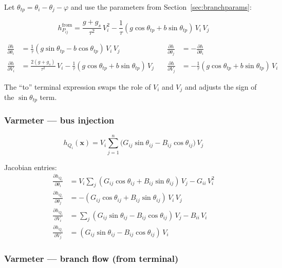 \documentclass[11pt,a4paper]{article}
\begin{document}
Let $\theta_{tp} = \theta_i - \theta_j - \varphi$ and use the parameters
from Section~\ref{sec:branchparams}:

\begin{equation}
  h_{P_{ij}}^\text{from} =
    \frac{g + g_s}{\tau^2}\,V_i^2
    - \frac{1}{\tau}(g\cos\theta_{tp} + b\sin\theta_{tp})\,V_i\,V_j
\end{equation}

\begin{align}
  \frac{\partial h}{\partial \theta_i} &=
    \tfrac{1}{\tau}(g\sin\theta_{tp} - b\cos\theta_{tp})\,V_i\,V_j
  &\quad \frac{\partial h}{\partial \theta_j} &= -\frac{\partial h}{\partial \theta_i}
  \\
  \frac{\partial h}{\partial V_i} &=
    \tfrac{2(g+g_s)}{\tau^2}\,V_i - \tfrac{1}{\tau}(g\cos\theta_{tp} +
    b\sin\theta_{tp})\,V_j
  &\quad \frac{\partial h}{\partial V_j} &=
    -\tfrac{1}{\tau}(g\cos\theta_{tp} + b\sin\theta_{tp})\,V_i
\end{align}

\noindent
The ``to'' terminal expression swaps the role of $V_i$ and $V_j$ and
adjusts the sign of the $\sin\theta_{tp}$ term.

\subsubsection{Varmeter --- bus injection}

\begin{equation}
  h_{Q_i}(\mathbf{x}) = V_i \sum_{j=1}^{n}
    \bigl(G_{ij}\sin\theta_{ij} - B_{ij}\cos\theta_{ij}\bigr)\,V_j
\end{equation}

Jacobian entries:
\begin{align}
  \frac{\partial h_{Q_i}}{\partial \theta_i} &=
    V_i \sum_{j} (G_{ij}\cos\theta_{ij} + B_{ij}\sin\theta_{ij})\,V_j
    - G_{ii}\,V_i^2 \\
  \frac{\partial h_{Q_i}}{\partial \theta_j} &=
    -(G_{ij}\cos\theta_{ij} + B_{ij}\sin\theta_{ij})\,V_i\,V_j \\
  \frac{\partial h_{Q_i}}{\partial V_i} &=
    \sum_{j} (G_{ij}\sin\theta_{ij} - B_{ij}\cos\theta_{ij})\,V_j
    - B_{ii}\,V_i \\
  \frac{\partial h_{Q_i}}{\partial V_j} &=
    (G_{ij}\sin\theta_{ij} - B_{ij}\cos\theta_{ij})\,V_i
\end{align}

\subsubsection{Varmeter --- branch flow (from terminal)}
\end{document}
